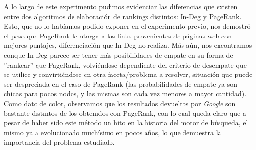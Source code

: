 \medskip
\par A lo largo de este experimento pudimos evidenciar las diferencias que
existen entre dos algoritmos de elaboraci\'on de rankings distintos: In-Deg y
PageRank. Esto, que no lo hab\'iamos podido exponer en el experimento previo,
nos demostr\'o el peso que PageRank le otorga a los links provenientes de
p\'aginas web con mejores puntajes, diferenciaci\'on que In-Deg no realiza.
M\'as a\'un, nos encontramos conque In-Deg parece ser tener m\'as posibilidades
de empate en su forma de ''rankear'' que PageRank, volvi\'endose dependiente del
criterio de desempate que se utilice y convirti\'endose en otra
faceta/problema a resolver, situaci\'on que puede ser despreciada en el caso de
PageRank (las probabilidades de empate ya son chicas para pocos nodos, y las
mismas son cada vez menores a mayor cantidad). Como dato de color, observamos
que los resultados devueltos por \emph{Google} son bastante distintos de los
obtenidos con PageRank, con lo cual queda claro que a pesar de haber sido este
m\'etodo un hito en la historia del motor de b\'usqueda, el mismo ya a
evolucionado much\'isimo en pocos a\~nos, lo que demuestra la importancia del
problema estudiado. 
